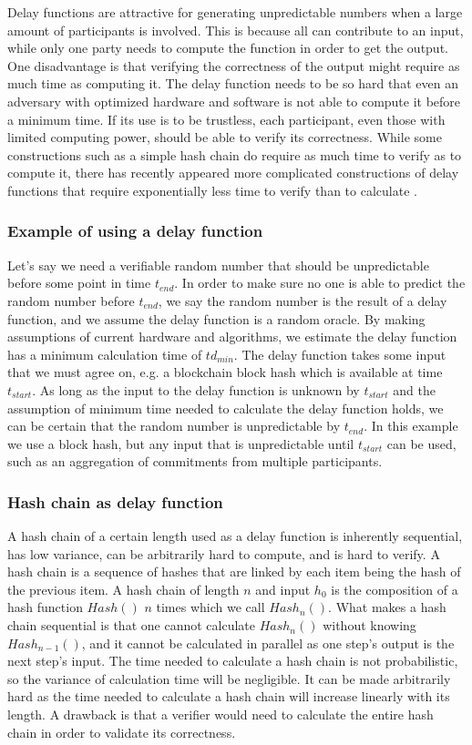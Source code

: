 Delay functions are attractive for generating unpredictable numbers when a large amount of participants is involved. This is because all can contribute to an input, while only one party needs to compute the function in order to get the output. One disadvantage is that verifying the correctness of the output might require as much time as computing it. The delay function needs to be so hard that even an adversary with optimized hardware and software is not able to compute it before a minimum time. If its use is to be trustless, each participant, even those with limited computing power, should be able to verify its correctness. While some constructions such as a simple hash chain do require as much time to verify as to compute it, there has recently appeared more complicated constructions of delay functions that require exponentially less time to verify than to calculate \cite{boneh_verifiable_2018}.

\subsubsection{Example of using a delay function}
Let's say we need a verifiable random number that should be unpredictable before some point in time $t_{end}$. In order to make sure no one is able to predict the random number before $t_{end}$, we say the random number is the result of a delay function, and we assume the delay function is a random oracle. By making assumptions of current hardware and algorithms, we estimate the delay function has a minimum calculation time of $td_{min}$. The delay function takes some input that we must agree on, e.g. a blockchain block hash which is available at time $t_{start}$. As long as the input to the delay function is unknown by $t_{start}$ and the assumption of minimum time needed to calculate the delay function holds, we can be certain that the random number is unpredictable by $t_{end}$. In this example we use a block hash, but any input that is unpredictable until $t_{start}$ can be used, such as an aggregation of commitments from multiple participants.

\subsubsection{Hash chain as delay function}
A hash chain of a certain length used as a delay function is inherently sequential, has low variance, can be arbitrarily hard to compute, and is hard to verify. A hash chain is a sequence of hashes that are linked by each item being the hash of the previous item. A hash chain of length $n$ and input $h_0$ is the composition of a hash function $Hash()$ $n$ times which we call $Hash_n()$. What makes a hash chain sequential is that one cannot calculate $Hash_n()$ without knowing $Hash_{n-1}()$, and it cannot be calculated in parallel as one step's output is the next step's input. The time needed to calculate a hash chain is not probabilistic, so the variance of calculation time will be negligible. It can be made arbitrarily hard as the time needed to calculate a hash chain will increase linearly with its length. A drawback is that a verifier would need to calculate the entire hash chain in order to validate its correctness. 

